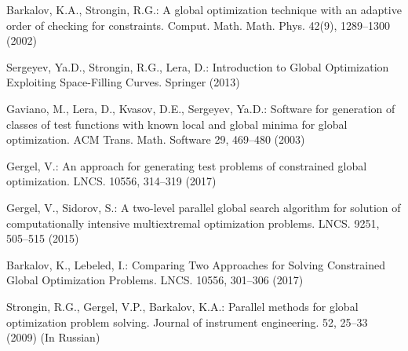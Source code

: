 \documentclass[smallextended]{svjour3}       %
\begin{document}
\begin{thebibliography}{}
Barkalov, K.A., Strongin, R.G.: A global optimization technique with an adaptive order of checking for constraints. Comput. Math. Math. Phys. 42(9), 1289--1300 (2002)

Sergeyev, Ya.D., Strongin, R.G., Lera, D.: Introduction to Global Optimization Exploiting Space-Filling Curves. Springer (2013)

Gaviano, M., Lera, D., Kvasov, D.E., Sergeyev, Ya.D.: Software for generation of classes of test functions with known local and global minima for global optimization. ACM Trans. Math. Software 29, 469--480 (2003)

Gergel, V.: An approach for generating test problems of constrained global optimization. LNCS. 10556, 314--319 (2017)


Gergel, V., Sidorov, S.: A two-level parallel global search algorithm for solution of computationally intensive multiextremal optimization problems. LNCS. 9251, 505--515 (2015)

Barkalov, K., Lebeled, I.: Comparing Two Approaches for Solving Constrained Global Optimization Problems. LNCS. 10556, 301--306 (2017)

Strongin, R.G., Gergel, V.P., Barkalov, K.A.: Parallel methods for global optimization problem solving. Journal of instrument engineering. 52, 25--33 (2009) (In Russian)



%
\end{thebibliography}
\end{document}
